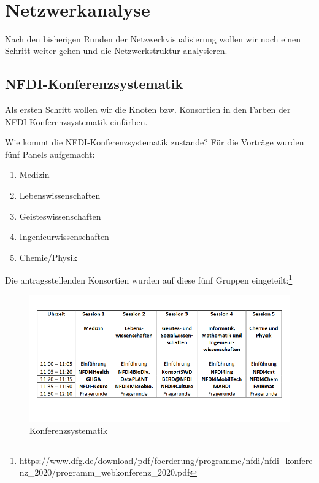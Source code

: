 \documentclass[11pt]{article}
\providecommand{\tightlist}{%
      \setlength{\itemsep}{0pt}\setlength{\parskip}{0pt}}
\begin{document}
    \begin{center}
    \end{center}
    { \hspace*{\fill} \\}
    
    \hypertarget{netzwerkanalyse}{%
\section{Netzwerkanalyse}\label{netzwerkanalyse}}

Nach den bisherigen Runden der Netzwerkvisualisierung wollen wir noch
einen Schritt weiter gehen und die Netzwerkstruktur analysieren.

\hypertarget{nfdi-konferenzsystematik}{%
\subsection{NFDI-Konferenzsystematik}\label{nfdi-konferenzsystematik}}

Als ersten Schritt wollen wir die Knoten bzw. Konsortien in den Farben
der NFDI-Konferenzsystematik einfärben.

Wie kommt die NFDI-Konferenzsystematik zustande? Für die Vorträge wurden
fünf Panels aufgemacht:

\begin{enumerate}
\def\labelenumi{\arabic{enumi}.}
\tightlist
\item
  Medizin
\item
  Lebenswissenschaften
\item
  Geisteswissenschaften
\item
  Ingenieurwissenschaften
\item
  Chemie/Physik
\end{enumerate}

    Die antragsstellenden Konsortien wurden auf diese fünf Gruppen
eingeteilt:\footnote{https://www.dfg.de/download/pdf/foerderung/programme/nfdi/nfdi\_konferenz\_2020/programm\_webkonferenz\_2020.pdf}

\begin{figure}
\centering
\includegraphics{img/nfdi-konferenzsystematik.png}
\caption{Konferenzsystematik}
\end{figure}
\end{document}
